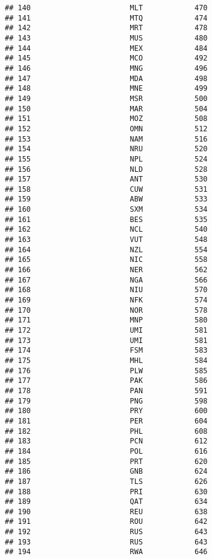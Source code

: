 \documentclass[
]{article}
\begin{document}
\begin{verbatim}
## 140                       MLT            470
## 141                       MTQ            474
## 142                       MRT            478
## 143                       MUS            480
## 144                       MEX            484
## 145                       MCO            492
## 146                       MNG            496
## 147                       MDA            498
## 148                       MNE            499
## 149                       MSR            500
## 150                       MAR            504
## 151                       MOZ            508
## 152                       OMN            512
## 153                       NAM            516
## 154                       NRU            520
## 155                       NPL            524
## 156                       NLD            528
## 157                       ANT            530
## 158                       CUW            531
## 159                       ABW            533
## 160                       SXM            534
## 161                       BES            535
## 162                       NCL            540
## 163                       VUT            548
## 164                       NZL            554
## 165                       NIC            558
## 166                       NER            562
## 167                       NGA            566
## 168                       NIU            570
## 169                       NFK            574
## 170                       NOR            578
## 171                       MNP            580
## 172                       UMI            581
## 173                       UMI            581
## 174                       FSM            583
## 175                       MHL            584
## 176                       PLW            585
## 177                       PAK            586
## 178                       PAN            591
## 179                       PNG            598
## 180                       PRY            600
## 181                       PER            604
## 182                       PHL            608
## 183                       PCN            612
## 184                       POL            616
## 185                       PRT            620
## 186                       GNB            624
## 187                       TLS            626
## 188                       PRI            630
## 189                       QAT            634
## 190                       REU            638
## 191                       ROU            642
## 192                       RUS            643
## 193                       RUS            643
## 194                       RWA            646

\end{verbatim}
\end{document}

